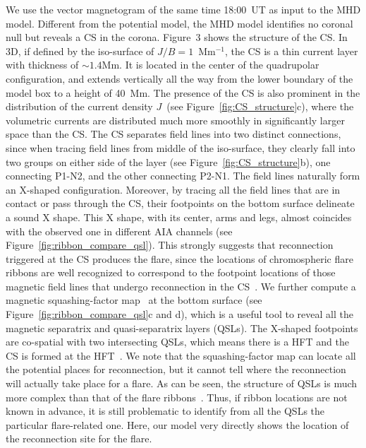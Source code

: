 \documentclass[twocolumn]{aastex6} %
\newcommand{\Fig}{{Figure}}
\begin{document}
\begin{CJK*}{UTF8}{gbsn}
We use the vector magnetogram of the same time 18:00~UT as input to
the MHD model. Different from the potential model, the MHD model
identifies no coronal null but reveals a CS in the corona. \Fig~3 shows
the structure of the CS. In 3D, if defined by the iso-surface of
$J/B=1$~Mm$^{-1}$, the CS is a thin current layer with thickness of
$\sim 1.4$Mm. It is located in the center of the quadrupolar
configuration, and extends vertically all the way from the lower
boundary of the model box to a height of 40~Mm. The presence of the CS
is also prominent in the distribution of the current density $J$~(see
\Fig~\ref{fig:CS_structure}c), where the volumetric currents are
distributed much more smoothly in significantly larger space than the
CS. The CS separates field lines into two distinct connections, since when tracing field
lines from middle of the iso-surface, they clearly fall into two groups on either side of the layer
(see \Fig~\ref{fig:CS_structure}b), one connecting P1-N2, and the other connecting
P2-N1. The field lines naturally form an X-shaped
configuration. Moreover, by tracing all the field lines that are in
contact or pass through the CS, their footpoints on the bottom surface
delineate a sound X shape. This X shape, with its center, arms and legs,
almost coincides with the observed one in different AIA channels
(see \Fig~\ref{fig:ribbon_compare_qsl}). This strongly
suggests that reconnection triggered at the CS produces the flare,
since the locations of chromospheric flare
ribbons are well recognized to correspond to the footpoint locations of those magnetic field
lines that undergo reconnection in the CS~\citep{Qiu2009}. We further compute
a magnetic squashing-factor map~\citep{Titov2002} at the bottom
surface (see \Fig~\ref{fig:ribbon_compare_qsl}c and d), which is a useful tool to reveal all the
magnetic separatrix and quasi-separatrix layers (QSLs). The X-shaped
footpoints are co-spatial with two intersecting QSLs, which means
there is a HFT and the CS is formed at the HFT~\citep[see
also][]{LiuR2016NatSR}. We note that the squashing-factor map can
locate all the potential places for reconnection,
but it cannot tell
where the reconnection will actually take place for a flare. As can be
seen, the structure of QSLs is much more complex than that of the flare
ribbons~{\citep{Savcheva2015, Inoue2016}}. Thus, if ribbon locations are not known in advance, it is
still problematic to identify from all the QSLs the particular
flare-related one. Here, our model very directly shows the location
of the reconnection site for the flare.




\end{CJK*}
\end{document}
